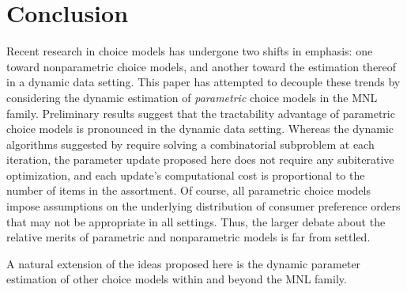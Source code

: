 \documentclass[preprint,12pt,authoryear]{elsarticle}
\begin{document}
\section{Conclusion}
Recent research in choice models has undergone two shifts in emphasis: one toward nonparametric choice models, and another toward the estimation thereof in a dynamic data setting. This paper has attempted to decouple these trends by considering the dynamic estimation of \emph{parametric} choice models in the MNL family. Preliminary results suggest that the tractability advantage of parametric choice models is pronounced in the dynamic data setting. Whereas the dynamic algorithms suggested by \cite{honguyen2021} require solving a combinatorial subproblem at each iteration, the parameter update proposed here does not require any subiterative optimization, and each update's computational cost is proportional to the number of items in the assortment. Of course, all parametric choice models impose assumptions on the underlying distribution of consumer preference orders that may not be appropriate in all settings. Thus, the larger debate about the relative merits of parametric and nonparametric models is far from settled.

A natural extension of the ideas proposed here is the dynamic parameter estimation of other choice models within and beyond the MNL family. 




\end{document}
